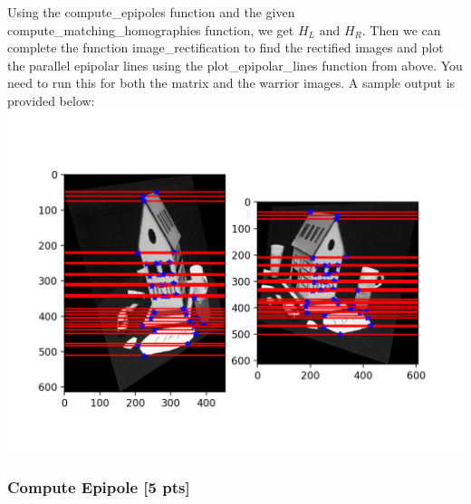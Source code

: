 \documentclass[11pt]{article}
\makeatletter
\def\maxwidth{\ifdim\Gin@nat@width>\linewidth\linewidth
    \else\Gin@nat@width\fi}
\let\Oldincludegraphics\includegraphics
\renewcommand{\includegraphics}[1]{\Oldincludegraphics[width=.8\maxwidth]{#1}}
\makeatother
\begin{document}
Using the compute\_epipoles function and the given
compute\_matching\_homographies function, we get \(H_L\) and \(H_R\).
Then we can complete the function image\_rectification to find the
rectified images and plot the parallel epipolar lines using the
plot\_epipolar\_lines function from above. You need to run this for both
the matrix and the warrior images. A sample output is provided below:
\includegraphics{sample_rectification.png}

    \subsubsection{Compute Epipole {[}5 pts{]}}\label{compute-epipole-5-pts}
\end{document}
